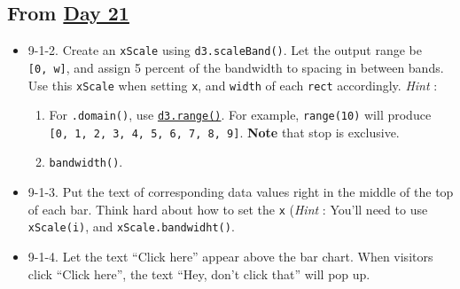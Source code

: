 \documentclass[
]{book}
\begin{document}
\hypertarget{from-day-21}{%
\subsection{\texorpdfstring{From \href{https://observablehq.com/@hongtaoh/day-twenty-one-task-9-continued-2020-09-14}{Day 21}}{From Day 21}}\label{from-day-21}}

\begin{itemize}
\item
  9-1-2. Create an \texttt{xScale} using \texttt{d3.scaleBand()}. Let the output range be \texttt{{[}0,\ w{]}}, and assign 5 percent of the bandwidth to spacing in between bands. Use this \texttt{xScale} when setting \texttt{x}, and \texttt{width} of each \texttt{rect} accordingly. \emph{Hint} :

  \begin{enumerate}
  \def\labelenumi{\arabic{enumi}.}
  \item
    For \texttt{.domain()}, use \href{https://github.com/d3/d3-array\#range}{\texttt{d3.range()}}. For example, \texttt{range(10)} will produce \texttt{{[}0,\ 1,\ 2,\ 3,\ 4,\ 5,\ 6,\ 7,\ 8,\ 9{]}}. \textbf{Note} that stop is exclusive.
  \item
    \texttt{bandwidth()}.
  \end{enumerate}
\item
  9-1-3. Put the text of corresponding data values right in the middle of the top of each bar. Think hard about how to set the \texttt{x} (\emph{Hint} : You'll need to use \texttt{xScale(i)}, and \texttt{xScale.bandwidht()}.
\item
  9-1-4. Let the text ``Click here'' appear above the bar chart. When visitors click ``Click here'', the text ``Hey, don't click that'' will pop up.


\end{itemize}
\end{document}
